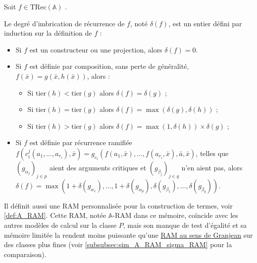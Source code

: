 \documentclass{report}
\newcommand{\bbA}{\mathbb{A}}
\newcommand{\TRec}[1]{\text{TRec}\left(\mathbb{#1}\right)}
\begin{document}
		
		\begin{definition}
			\label{def:degre_recurrence}
			
			Soit $f \in \TRec{A}$ \footnotemark. 
			
			
			Le degré d'imbrication de récurrence de $f$, noté $\delta(f)$, est un entier défini par induction sur la définition de $f$ :
			
			\begin{itemize}[itemsep=-1mm]
				\item 	Si $f$ est un constructeur ou une projection, alors $\delta(f) = 0$.
				\item 	Si $f$ est définie par composition, sans perte de généralité, $f(\bar{x}) = g\left( \bar{x}, h\left( \bar{x}\right)\right)$, alors :
				
						\begin{itemize}[itemsep=-1mm]
							\item 	Si $\text{tier}(h) < \text{tier}(g)$ alors $\delta(f) = \delta(g)$ ;
							\item 	Si $\text{tier}(h) = \text{tier}(g)$ alors $\delta(f) = \max\left(\delta(g), \delta(h)\right)$ ;
							\item 	Si $\text{tier}(h) > \text{tier}(g)$ alors $\delta(f) = \max\left(1, \delta(h)\right) \times \delta(g)$ ;
						\end{itemize}
						
				\item 	Si $f$ est définie par récurrence ramifiée $f(c_i^j(a_1, \dots, a_{r_i}), \bar{x}) = g_{c_i}\left( f(a_1, \bar{x}), \dots, f(a_{r_i}, \bar{x}), \bar{a}, \bar{x} \right)$, telles que $\left( g_{\alpha_j}\right)_{j\in p}$ aient des arguments critiques et $\left( g_{\beta_j}\right)_{j\in q}$ n'en aient pas, alors $\delta(f) = \max\left( 1 + \delta\left( g_{\alpha_1} \right), \dots,  1 + \delta\left( g_{\alpha_p} \right), \delta\left( g_{\beta_1} \right), \dots,  \delta\left( g_{\beta_q} \right)\right)$. 
			\end{itemize}
		\end{definition}
		
		
		Il définit aussi une RAM personnalisée pour la construction de termes, voir \ref{def:A_RAM}. Cette RAM, notée $\bbA$-RAM dans ce mémoire, coïncide avec les autres modèles de calcul sur la classe $P$, mais son manque de test d'égalité et sa mémoire limitée la rendent moins puissante qu'une \hyperref[def:sigma_RAM]{RAM au sens de Granjean} \cite{GrandjeanSchwentick2002} sur des classes plus fines (voir \ref{subsubsec:sim_A_RAM_sigma_RAM} pour la comparaison).
		
\end{document}
